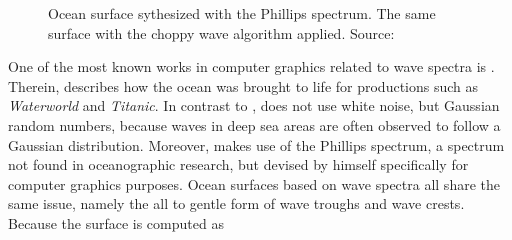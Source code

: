 %
\begin{figure}
 \centering
 \caption{
 Ocean surface sythesized with the Phillips spectrum.
 The same surface with the choppy wave algorithm applied.
Source: \cite{course:simulatingocean}
}
\label{fig:tessendorf_choppy_waves}
\end{figure}
%
One of the most known works in computer graphics related to wave spectra is
\cite{course:simulatingocean}. Therein, \citeauthor{course:simulatingocean}
describes how the ocean was brought to life for productions such as
\emph{Waterworld} and \emph{Titanic}. In contrast to \citeauthor{Mastin:1987},
\citeauthor{course:simulatingocean} does not use white noise, but Gaussian
random numbers, because waves in deep sea areas are often observed to follow a
Gaussian distribution. Moreover, \citeauthor{course:simulatingocean}
makes use of the Phillips spectrum, a spectrum not found in oceanographic
research, but devised by himself specifically for computer graphics purposes.
Ocean surfaces based on wave spectra all share the same issue, namely the all to
gentle form of wave troughs and wave crests. Because the surface is computed as

